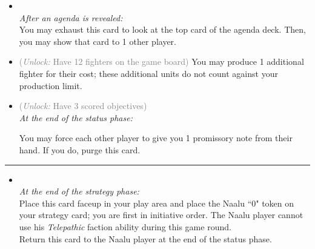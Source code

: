 \begin{multicols}{2}

\begin{itemize}
\item {}\\
\emph{After an agenda is revealed:}
\\
You may exhaust this card to look at the top card of the agenda deck. Then, you may show that card to 1 other player. 
\item {} \textcolor{gray}{(\emph{Unlock:} Have 12 fighters on the game board)}
You may produce 1 additional fighter for their cost; these additional units do not count against your production limit.
\item {} \textcolor{gray}{(\emph{Unlock:} Have 3 scored objectives)}\\
\emph{At the end of the status phase:}

You may force each other player to give you 1 promissory note from their hand. If you do, purge this card.
\end{itemize}

\vspace{-10pt}\rule{\hsize}{0.4pt}\vspace{5pt}


\begin{itemize}
\item {}\\
\emph{At the end of the strategy phase:}\\
Place this card faceup in your play area and place the Naalu ``0" token on your strategy card; you are first in initiative order. The Naalu player cannot use his \emph{Telepathic} faction ability during this game round.\\
Return this card to the Naalu player at the end of the status phase.
\end{itemize}

\end{multicols}



